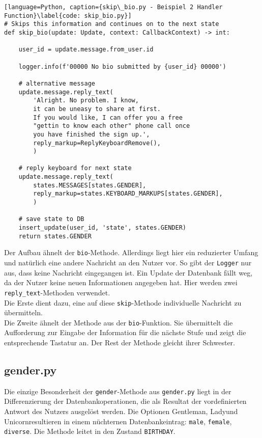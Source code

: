                 \begin{lstlisting}[language=Python, caption={skip\_bio.py - Beispiel 2 Handler Function}\label{code: skip_bio.py}]
# Skips this information and continues on to the next state
def skip_bio(update: Update, context: CallbackContext) -> int:
    
    user_id = update.message.from_user.id

    logger.info(f'00000 No bio submitted by {user_id} 00000')

    # alternative message
    update.message.reply_text(
        'Alright. No problem. I know, 
        it can be uneasy to share at first. 
        If you would like, I can offer you a free 
        "gettin to know each other" phone call once 
        you have finished the sign up.',
        reply_markup=ReplyKeyboardRemove(),
        )

    # reply keyboard for next state
    update.message.reply_text(
        states.MESSAGES[states.GENDER],
        reply_markup=states.KEYBOARD_MARKUPS[states.GENDER],
        )    

    # save state to DB
    insert_update(user_id, 'state', states.GENDER)
    return states.GENDER
                \end{lstlisting}


                Der Aufbau ähnelt der \verb|bio|-Methode. Allerdings liegt hier ein reduzierter Umfang und natürlich eine andere Nachricht an den Nutzer vor. So gibt der \verb|Logger| nur aus, dass keine Nachricht eingegangen ist. Ein Update der Datenbank fällt weg, da der Nutzer keine neuen Informationen angegeben hat. Hier werden zwei \verb|reply_text|-Methoden verwendet. \\
                Die Erste dient dazu, eine auf diese \verb|skip|-Methode individuelle Nachricht zu übermitteln. \\
                Die Zweite ähnelt der Methode aus der \verb|bio|-Funktion. Sie übermittelt die Aufforderung zur Eingabe der Information für die nächste Stufe und zeigt die entsprechende Tastatur an. Der Rest der Methode gleicht ihrer Schwester.


        \subsection{gender.py} \label{Implementierung: gender.py}
                Die einzige Besonderheit der \verb|gender|-Methode aus \verb|gender.py| liegt in der Differenzierung der Datenbankoperationen, die als Resultat der vordefinierten Antwort des Nutzers ausgelöst werden. Die Optionen \glqq Gentleman\grqq, \glqq Lady\grqq und \glqq Unicorn\grqq resultieren in einem nüchternen Datenbankeintrag: \verb|male|, \verb|female|, \verb|diverse|. Die Methode leitet in den Zustand \verb|BIRTHDAY|.
            
